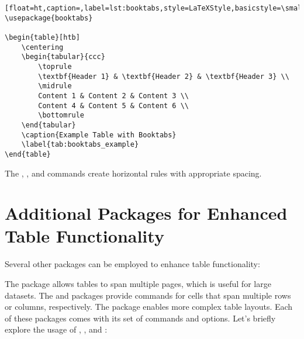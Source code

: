 		\begin{lstlisting}[float=ht,caption=,label=lst:booktabs,style=LaTeXStyle,basicstyle=\small\ttfamily,]
\usepackage{booktabs}

\begin{table}[htb]
	\centering
	\begin{tabular}{ccc}
		\toprule
		\textbf{Header 1} & \textbf{Header 2} & \textbf{Header 3} \\
		\midrule
		Content 1 & Content 2 & Content 3 \\
		Content 4 & Content 5 & Content 6 \\
		\bottomrule
	\end{tabular}
	\caption{Example Table with Booktabs}
	\label{tab:booktabs_example}
\end{table}
		\end{lstlisting}

		The , , and  commands create horizontal rules with appropriate spacing.

	\section{Additional Packages for Enhanced Table Functionality}

		Several other packages can be employed to enhance table functionality:

		The  package allows tables to span multiple pages, which is useful for large datasets.
		The  and  packages provide commands for cells that span multiple rows or columns, respectively.
		The  package enables more complex table layouts.
		Each of these packages comes with its set of commands and options. Let's briefly explore the usage of , , and :

